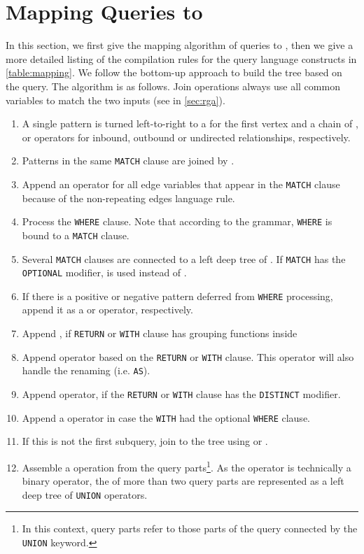 \section{Mapping \opencypher Queries to \RGA}
\label{sec:compilation}

In this section, we first give the mapping algorithm of \opencypher queries to \rga, then we give a more detailed listing of the compilation rules for the query language constructs in \autoref{table:mapping}.
We follow the bottom-up approach to build the \rga tree based on the \opencypher query. The algorithm is as follows. Join operations always use all common variables to match the two inputs (see \jointext in \autoref{sec:rga}).

\setlength\tabcolsep{3.6pt}
\begin{enumerate}
\label{alg:build-rga-tree}
	\item A single pattern is turned left-to-right to a \getverticestext for the first vertex and a chain of \expandintext, \expandouttext or \expandbothtext operators for inbound, outbound or undirected relationships, respectively.
	\item Patterns in the same \lstinline+MATCH+ clause are joined by \jointext.
	\item Append an \alldifferenttext operator for all edge variables that appear in the \lstinline+MATCH+ clause because of the non-repeating edges language rule.
	\item Process the \lstinline+WHERE+ clause. Note that according to the grammar, \lstinline+WHERE+ is bound to a \lstinline+MATCH+ clause.
	\item Several \lstinline+MATCH+ clauses are connected to a left deep tree of \jointext. If \lstinline+MATCH+ has the \lstinline+OPTIONAL+ modifier, \leftouterjointext is used instead of \jointext.
	\item If there is a positive or negative pattern deferred from \lstinline+WHERE+ processing,
		append it as a \jointext or \antijointext operator, respectively.
	\item Append \groupingtext, if \lstinline+RETURN+ or \lstinline+WITH+ clause has grouping functions inside
	\item Append \projectiontext operator based on the \lstinline+RETURN+ or \lstinline+WITH+ clause. This operator will also handle the renaming (i.e. \lstinline+AS+).
	\item Append \duplicateeliminationtext operator, if the \lstinline+RETURN+ or \lstinline+WITH+ clause has the \lstinline+DISTINCT+ modifier.
	\item Append a \selectiontext operator in case the \lstinline+WITH+ had the optional \lstinline+WHERE+ clause.
	\item If this is not the first subquery, join to the \rga tree using \jointext or \leftouterjointext.
	\item Assemble a \uniontext operation from the query parts\footnote{In this context, query parts refer to those parts of the query connected by the \lstinline+UNION+ \opencypher keyword.}. As the \uniontext operator is technically a binary operator, the \uniontext of more than two query parts are represented as a left deep tree of \lstinline+UNION+ operators.
\end{enumerate}

